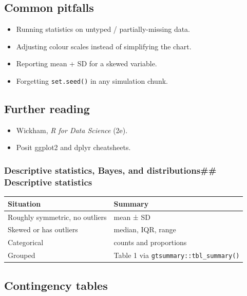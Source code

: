 \documentclass[
]{article}
\newcounter{none} %
\providecommand{\tightlist}{%
  \setlength{\itemsep}{0pt}\setlength{\parskip}{0pt}}
\begin{document}
\subsection{Common pitfalls}\label{common-pitfalls}

\begin{itemize}
\tightlist
\item
  Running statistics on untyped / partially-missing data.
\item
  Adjusting colour scales instead of simplifying the chart.
\item
  Reporting mean + SD for a skewed variable.
\item
  Forgetting \texttt{set.seed()} in any simulation chunk.
\end{itemize}

\subsection{Further reading}\label{further-reading}

\begin{itemize}
\tightlist
\item
  Wickham, \emph{R for Data Science} (2e).
\item
  Posit ggplot2 and dplyr cheatsheets.
\end{itemize}

\subsubsection{Descriptive statistics, Bayes, and distributions\#\#
Descriptive
statistics}\label{descriptive-statistics-bayes-and-distributions-descriptive-statistics}

{\def\LTcaptype{none} %
\begin{longtable}[]{@{}ll@{}}
\toprule\noalign{}
Situation & Summary \\
\midrule\noalign{}
\endhead
\bottomrule\noalign{}
\endlastfoot
Roughly symmetric, no outliers & mean ± SD \\
Skewed or has outliers & median, IQR, range \\
Categorical & counts and proportions \\
Grouped & Table 1 via \texttt{gtsummary::tbl\_summary()} \\
\end{longtable}
}

\subsection{Contingency tables}\label{contingency-tables}
\end{document}
